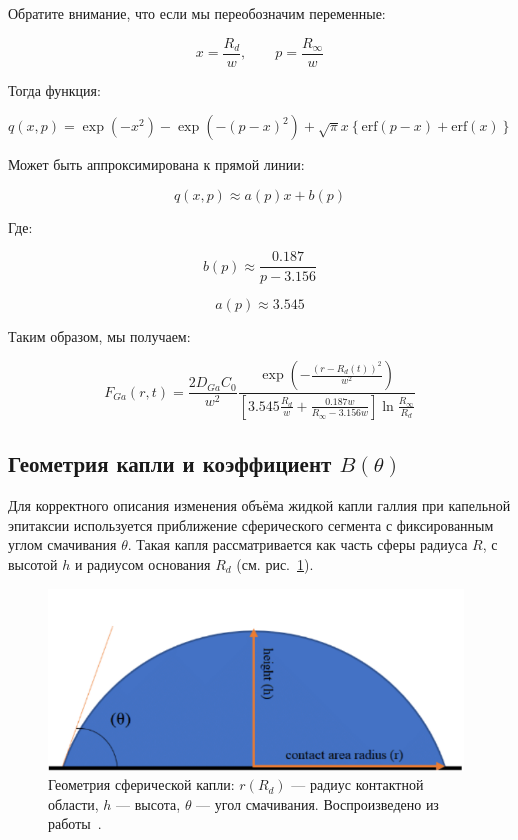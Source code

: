 \documentclass[14pt,oneside]{extarticle}
\begin{document}
Обратите внимание, что если мы переобозначим переменные:

\[
x=\frac{R_{d}}{w},\qquad p=\frac{R_{\infty}}{w}
\]

Тогда функция:

\[
q\left(x,p\right)=\exp\left(-x^{2}\right)-\exp\left(-\left(p-x\right)^{2}\right)+\sqrt{\pi}x\left\{ \text{erf}\left(p-x\right)+\text{erf}\left(x\right)\right\} 
\]

Может быть аппроксимирована к прямой линии:

\[
q\left(x,p\right)\approx a\left(p\right)x+b\left(p\right)
\]

Где:

\[
b\left(p\right)\approx\frac{0.187}{p-3.156}
\]

\[
a\left(p\right)\approx3.545
\]

Таким образом, мы получаем:

\begin{equation}
F_{Ga}\left(r,t\right)=\frac{2D_{Ga}C_{0}}{w^{2}}\frac{\exp\left(-\frac{\left(r-R_{d}\left(t\right)\right)^{2}}{w^{2}}\right)}{\left[3.545\frac{R_{d}}{w}+\frac{0.187w}{R_{\infty}-3.156w}\right]\ln\frac{R_{\infty}}{R_{d}}}
\end{equation}

\subsection{Геометрия капли и коэффициент $B(\theta)$}

Для корректного описания изменения объёма жидкой капли галлия при капельной эпитаксии используется приближение сферического сегмента с фиксированным углом смачивания $\theta$. Такая капля рассматривается как часть сферы радиуса $R$, с высотой $h$ и радиусом основания $R_d$ (см. рис.~\ref{fig:drop_geom}).

\begin{figure}
    \begin{center}
    \includegraphics[width=11cm]{images/contact_angle_schematic.png}
    \caption{\label{fig:drop_geom}
    Геометрия сферической капли: $r(R_d)$ — радиус контактной области, $h$ — высота, $\theta$ — угол смачивания. Воспроизведено из работы~\cite{aboubakri2021}.}
    \end{center}
\end{figure}
\end{document}
